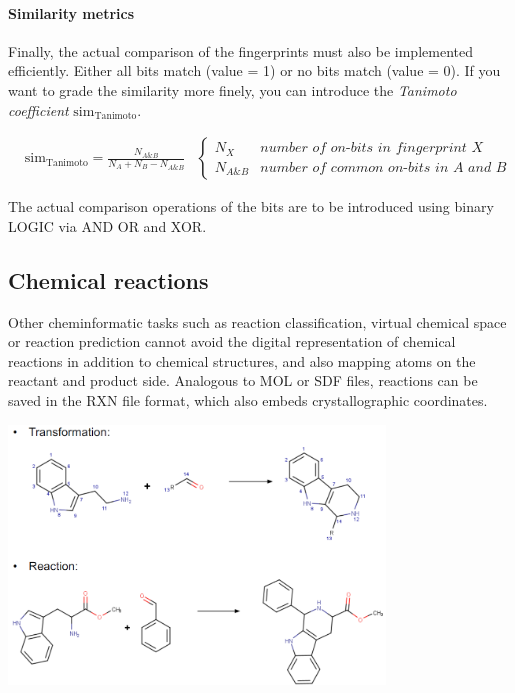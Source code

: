 \paragraph{Similarity metrics}
Finally, the actual comparison of the fingerprints must also be implemented efficiently. Either all bits match (value = 1) or no bits match (value = 0). If you want to grade the similarity more finely, you can introduce the \emph{Tanimoto coefficient} $\mathrm{sim}_\mathrm{Tanimoto}$.

\begin{align}
    &\mathrm{sim}_\mathrm{Tanimoto}=\frac{N_{A\&B}}{N_{A}+N_{B}-N_{A\&B}}&\begin{cases}
        N_X&\textit{number of on-bits in fingerprint X}\\
        N_{A\&B}&\textit{number of common on-bits in A and B}
    \end{cases}
\end{align}

The actual comparison operations of the bits are to be introduced using binary LOGIC via AND OR and XOR.

\subsection{Chemical reactions}

Other cheminformatic tasks such as reaction classification, virtual chemical space or reaction prediction cannot avoid the digital representation of chemical reactions in addition to chemical structures, and also mapping atoms on the reactant and product side. Analogous to MOL or SDF files, reactions can be saved in the RXN file format, which also embeds crystallographic coordinates.

\begin{center}\includegraphics[width=0.75\textwidth]{img/cheminformatics/ChemicalReactionsTransformation.png}\end{center}


